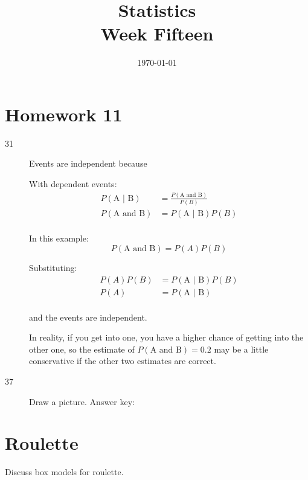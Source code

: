 \documentclass[landscape]{exam}
\title{Statistics \\ Week Fifteen}
\date{\today}
\author{}
\begin{document}
  \maketitle
  \tableofcontents

  \section{Homework 11}
  \begin{description}
    \item[31] Events are independent because

      With dependent events:
      \begin{align*}
        P( \text{A } | \text{ B} ) & = \frac{ P(\text{A and B}) }{ P(B) } \\
        P( \text{A and B} )        & = P( \text{A } | \text{ B} ) P(B) \\
      \end{align*}

      In this example:
      \[
        P(\text{A and B}) = P(A) P(B)
      \]

      Substituting:
      \begin{align*}
        P(A) P(B) & = P( \text{A } | \text{ B} ) P(B) \\
        P(A)      & = P( \text{A } | \text{ B} ) \\
      \end{align*}

      and the events are independent.

      In reality, if you get into one, you have a higher chance of getting into
      the other one, so the estimate of $P(\text{A and B}) = 0.2$ may be a
      little conservative if the other two estimates are correct.


    \item[37] Draw a picture. Answer key:

  \end{description}

  \section{Roulette}
  Discuss box models for roulette.
\end{document}
